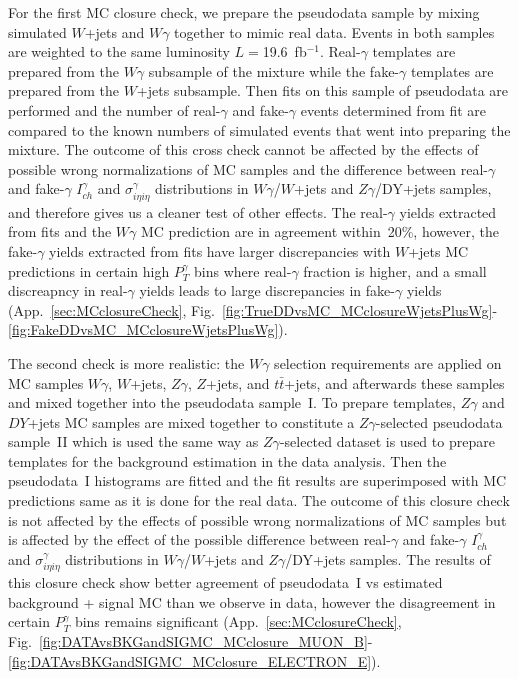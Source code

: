 For the first MC closure check, we prepare the pseudodata sample by mixing simulated $W$+jets and $W\gamma$ together to mimic real data. Events in both samples are weighted to the same luminosity $L=$19.6~fb$^{-1}$. Real-$\gamma$ templates are prepared from the $W\gamma$ subsample of the mixture while the fake-$\gamma$ templates are prepared from the $W$+jets subsample. Then fits on this sample of pseudodata are performed and the number of real-$\gamma$ and fake-$\gamma$ events determined from fit are compared to the known numbers of simulated events that went into preparing the mixture. The outcome of this cross check cannot be affected by  the effects of possible wrong normalizations of MC samples and the difference between real-$\gamma$ and fake-$\gamma$ $I_{ch}^{\gamma}$ and $\sigma_{i\eta i\eta}^{\gamma}$ distributions in $W\gamma$/$W$+jets and $Z\gamma$/DY+jets samples, and therefore gives us a cleaner test of other effects. The real-$\gamma$ yields extracted from fits and the $W\gamma$ MC prediction are in agreement within~20\%, however, the fake-$\gamma$ yields extracted from fits have larger discrepancies with $W$+jets MC predictions in certain high $P_T^{\gamma}$ bins where real-$\gamma$ fraction is higher, and a small discreapncy in real-$\gamma$ yields leads to large discrepancies in fake-$\gamma$ yields (App.~\ref{sec:MCclosureCheck}, Fig.~\ref{fig:TrueDDvsMC_MCclosureWjetsPlusWg}-\ref{fig:FakeDDvsMC_MCclosureWjetsPlusWg}).

The second check is more realistic: the $W\gamma$ selection requirements are applied on MC samples $W\gamma$, $W$+jets, $Z\gamma$, $Z$+jets, and $t\bar{t}$+jets, and afterwards these samples and mixed together into the pseudodata sample~I. To prepare templates, $Z\gamma$ and $DY$+jets MC samples are mixed together to constitute a $Z\gamma$-selected pseudodata sample~II which is used the same way as $Z\gamma$-selected dataset is used to prepare templates for the background estimation in the data analysis. Then the pseudodata~I histograms are fitted and the fit results are superimposed with MC predictions same as it is done for the real data. The outcome of this closure check is not affected by the effects of possible wrong normalizations of MC samples but is affected by the effect of the possible difference between real-$\gamma$ and fake-$\gamma$ $I_{ch}^{\gamma}$ and $\sigma_{i\eta i\eta}^{\gamma}$ distributions in $W\gamma$/$W$+jets and $Z\gamma$/DY+jets samples. The results of this closure check show better agreement of pseudodata~I vs estimated background + signal MC than we observe in data, however the disagreement in certain $P_T^{\gamma}$ bins remains significant (App.~\ref{sec:MCclosureCheck}, Fig.~\ref{fig:DATAvsBKGandSIGMC_MCclosure_MUON_B}-\ref{fig:DATAvsBKGandSIGMC_MCclosure_ELECTRON_E}).

